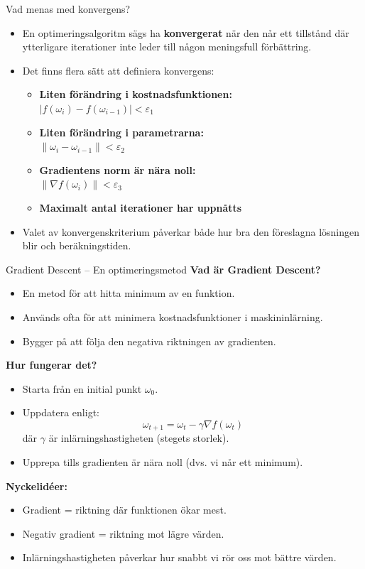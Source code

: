 \documentclass[10pt,english]{beamer}
\begin{document}
\begin{frame}{Vad menas med konvergens?}
  \begin{itemize}
    \item En optimeringsalgoritm sägs ha \textbf{konvergerat} när den når ett tillstånd där ytterligare iterationer inte leder till någon meningsfull förbättring.
    \item Det finns flera sätt att definiera konvergens:
    \begin{itemize}
      \item \textbf{Liten förändring i kostnadsfunktionen:} \\
        \( |f(\omega_{i}) - f(\omega_{i-1})| < \varepsilon_{1} \)
      \item \textbf{Liten förändring i parametrarna:} \\
        \( \|\omega_{i} - \omega_{i-1}\| < \varepsilon_{2} \)
      \item \textbf{Gradientens norm är nära noll:} \\
        \( \|\nabla f(\omega_{i})\| < \varepsilon_{3} \)
      \item \textbf{Maximalt antal iterationer har uppnåtts}
    \end{itemize}
    \item Valet av konvergenskriterium påverkar både hur bra den föreslagna lösningen blir och beräkningstiden.
  \end{itemize}
\end{frame}

\begin{frame}{Gradient Descent – En optimeringsmetod}
    \textbf{Vad är Gradient Descent?}
    \begin{itemize}
        \item En metod för att hitta minimum av en funktion.
        \item Används ofta för att minimera kostnadsfunktioner i maskininlärning.
        \item Bygger på att följa den negativa riktningen av gradienten.
    \end{itemize}

    \textbf{Hur fungerar det?}
    \begin{itemize}
        \item Starta från en initial punkt $\omega_0$.
        \item Uppdatera enligt: 
        \[
        \omega_{t+1} = \omega_t - \gamma \nabla f(\omega_t)
        \]
        där $\gamma$ är inlärningshastigheten (stegets storlek).
        \item Upprepa tills gradienten är nära noll (dvs. vi når ett minimum).
    \end{itemize}

    \textbf{Nyckelidéer:}
    \begin{itemize}
        \item Gradient = riktning där funktionen ökar mest.
        \item Negativ gradient = riktning mot lägre värden.
        \item Inlärningshastigheten påverkar hur snabbt vi rör oss mot bättre värden.
    \end{itemize}
\end{frame}
\end{document}
